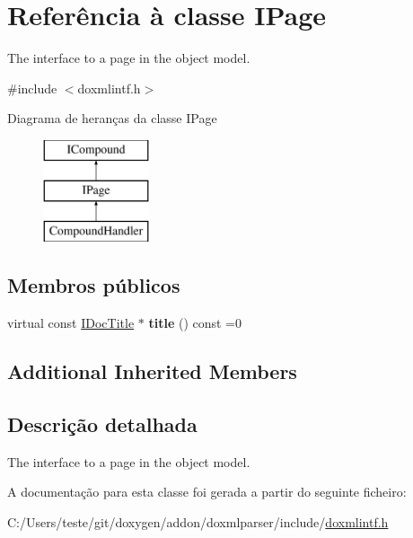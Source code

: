 \hypertarget{class_i_page}{\section{Referência à classe I\-Page}
\label{class_i_page}
}


The interface to a page in the object model.  




{\ttfamily \#include $<$doxmlintf.\-h$>$}

Diagrama de heranças da classe I\-Page\begin{figure}[H]
\begin{center}
\leavevmode
\includegraphics[height=3.000000cm]{class_i_page}
\end{center}
\end{figure}
\subsection*{Membros públicos}
\begin{DoxyCompactItemize}
\item 
\hypertarget{class_i_page_a36d773b9e5389c7c051fcf1c6b3e74bf}{virtual const \hyperlink{class_i_doc_title}{I\-Doc\-Title} $\ast$ {\bfseries title} () const =0}\label{class_i_page_a36d773b9e5389c7c051fcf1c6b3e74bf}

\end{DoxyCompactItemize}
\subsection*{Additional Inherited Members}


\subsection{Descrição detalhada}
The interface to a page in the object model. 

A documentação para esta classe foi gerada a partir do seguinte ficheiro\-:\begin{DoxyCompactItemize}
\item 
C\-:/\-Users/teste/git/doxygen/addon/doxmlparser/include/\hyperlink{include_2doxmlintf_8h}{doxmlintf.\-h}\end{DoxyCompactItemize}
